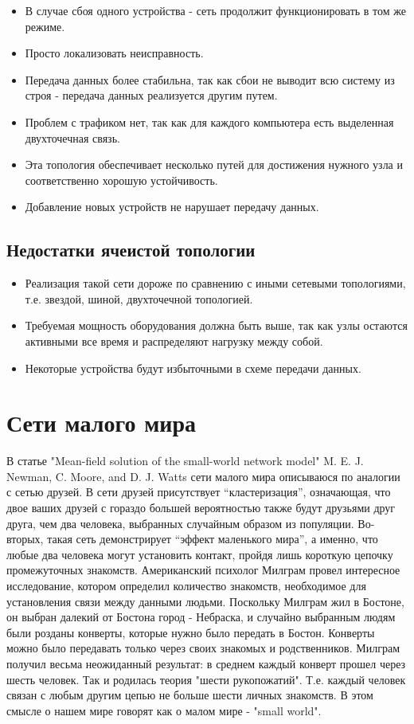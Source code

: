 \documentclass[a4paper]{article}
\begin{document}
\begin{itemize}
    \item В случае сбоя одного устройства - сеть продолжит функционировать в том же режиме.
    \item Просто локализовать неисправность.
    \item Передача данных более стабильна, так как сбои не выводит всю систему из строя - передача данных реализуется другим путем.
    \item Проблем с трафиком нет, так как для каждого компьютера есть выделенная двухточечная связь.
    \item Эта топология обеспечивает несколько путей для достижения нужного узла и соответственно хорошую устойчивость.
    \item Добавление новых устройств не нарушает передачу данных.
\end{itemize}

\subsection[]{Недостатки ячеистой топологии}
\begin{itemize}
    \item Реализация такой сети дороже по сравнению с иными сетевыми топологиями, т.е. звездой, шиной, двухточечной топологией.
    \item Требуемая мощность оборудования должна быть выше, так как узлы остаются активными все время и распределяют нагрузку между собой.
    \item Некоторые устройства будут избыточными в схеме передачи данных.
\end{itemize}

\section{Сети малого мира}
В статье "Mean-field solution of the small-world network model" M. E. J. Newman, C. Moore, and D. J. Watts сети малого мира описываюся по аналогии с сетью друзей. 
В сети друзей присутствует “кластеризация”, означающая, что двое ваших друзей с гораздо большей вероятностью также будут друзьями друг друга, чем два человека, выбранных случайным образом из популяции. 
Во-вторых, такая сеть демонстрирует “эффект маленького мира”, а именно, что любые два человека могут установить контакт, пройдя лишь короткую цепочку промежуточных знакомств. 
Американский психолог Милграм провел интересное исследование, котором определил количество знакомств, необходимое для установления связи между данными людьми. Поскольку Милграм жил в Бостоне, он выбран далекий от Бостона город - Небраска, 
и случайно выбранным людям были розданы конверты, которые нужно было передать в Бостон. Конверты можно было передавать только через своих знакомых и родственников. Милграм получил весьма неожиданный результат: 
в среднем каждый конверт прошел через шесть человек. Так и родилась теория "шести рукопожатий". Т.е. каждый человек связан с любым другим цепью не больше шести личных знакомств. В этом смысле о нашем мире говорят как о малом мире - "small world".
\end{document}

